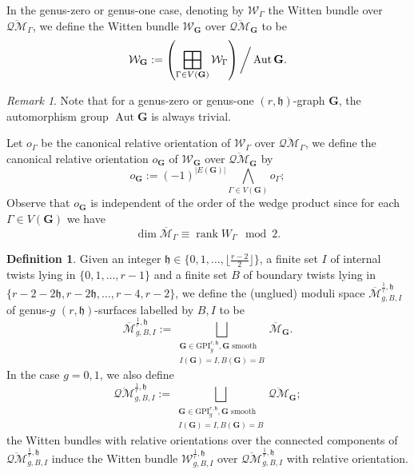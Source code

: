 \documentclass[11pt,a4paper]{article}
\theoremstyle{definition}
\newtheorem{dfn}[dummy]{Definition}
\theoremstyle{remark}
\newtheorem{rmk}[dummy]{Remark}
\newcommand{\oQMb}{{\overline{\mathcal{QM}}}}
\numberwithin{equation}{section}
\def\Mbar{{\overline{\mathcal M}}}
\def\GPI{{\text{GPI}}}
\def\h{{\mathfrak h}}
\DeclareMathOperator*{\bboxplus}{\scalerel*{\boxplus}{\sum}}
\begin{document}
In the genus-zero or genus-one case,
denoting by $\mathcal W_\Gamma$ the Witten bundle over $\oQMb_\Gamma$, we define the Witten bundle $\mathcal W_\mathbf{G}$ over $\oQMb_\mathbf{G}$ to be 
$$
 \mathcal W_\mathbf{G}:= \left(\bboxplus_{\Gamma\in V(\mathbf{G})}\mathcal W_\Gamma\right)\bigg\slash \operatorname{Aut} \mathbf{G}.
$$
\begin{rmk}
Note that for a genus-zero or genus-one $(r,\h)$-graph $\mathbf{G}$, the automorphism group $\operatorname{Aut}\mathbf{G}$ is always trivial. 

\end{rmk}
Let $o_\Gamma$ be the canonical relative orientation of $\mathcal W_\Gamma$ over $\oQMb_\Gamma$, we define the canonical relative orientation $o_\mathbf{G}$ of $\mathcal W_\mathbf{G}$ over $\oQMb_\mathbf{G}$ by
\begin{equation}\label{eq orientation point insertion}
    o_\mathbf{G}:=(-1)^{\lvert E(\mathbf{G})\rvert}\bigwedge_{\Gamma\in V(\mathbf{G})}o_\Gamma;
\end{equation}
Observe that $o_\mathbf{G}$ is independent of the order of the wedge product since for each $\Gamma\in V(\mathbf{G})$ we have 
$$
\dim \Mbar_\Gamma \equiv \operatorname{rank} W_\Gamma \mod 2.
$$
\begin{dfn} Given an integer $\h\in \{0,1,\dots,\lfloor\frac{r-2}{2}\rfloor\}$, a finite set $I$ of internal twists lying in $\{0,1,\dots,r-1\}$ and a finite set $B$ of boundary twists lying in $\{r-2-2\h,r-2\h,\dots,r-4,r-2\}$, we define the (unglued) moduli space $\Mbar^{\frac{1}{r},\h}_{g,B,I}$ of genus-$g$  $(r,\h)$-surfaces labelled by $B,I$  to be
\begin{equation}\label{eq def moduli point insertion}
    \Mbar^{\frac{1}{r},\h}_{g,B,I}:=\bigsqcup_{\substack{\mathbf{G}\in \GPI^{r,\h}_g, \mathbf{G} \text{ smooth}\\I(\mathbf{G})=I,B(\mathbf{G})=B}}\Mbar_\mathbf{G}.
\end{equation}
In the case $g=0,1$, we also define
$$\oQMb^{\frac{1}{r},\h}_{g,B,I}:=\bigsqcup_{\substack{\mathbf{G}\in \GPI^{r,\h}_g, \mathbf{G} \text{ smooth}\\I(\mathbf{G})=I,B(\mathbf{G})=B}}\oQMb_\mathbf{G};$$
the Witten bundles with relative orientations over the connected components of $\oQMb^{\frac{1}{r},\h}_{g,B,I}$ induce the Witten bundle $\mathcal W^{\frac{1}{r},\h}_{g,B,I}$ over $\oQMb^{\frac{1}{r},\h}_{g,B,I}$ with relative orientation.
\end{dfn}

  
\end{document}
